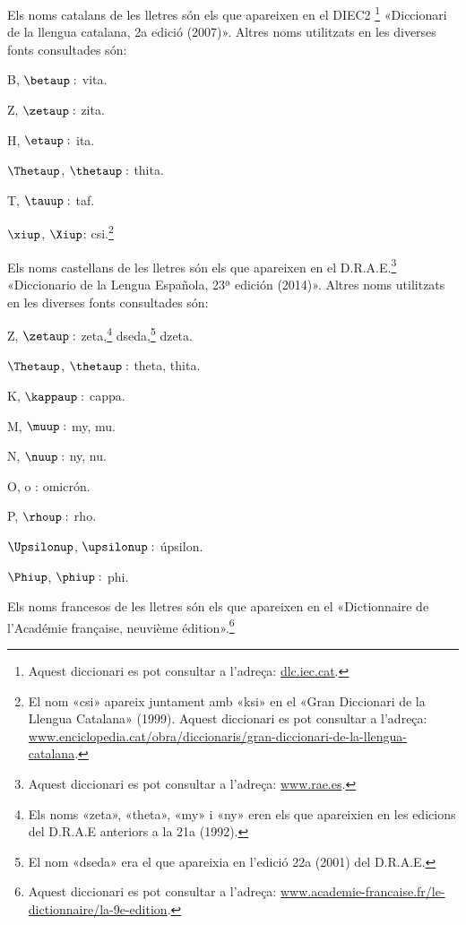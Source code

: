 Els noms catalans de les lletres són els que apareixen en el DIEC2 \footnote{Aquest diccionari es pot consultar a l'adreça: \href{http://dlc.iec.cat/}{dlc.iec.cat}.} «Diccionari de la llengua catalana, 2a edició (2007)». Altres noms utilitzats en
les diverses fonts consultades són:
\begin{multicols}{3}
\begin{list}{}
   {\setlength{\labelwidth}{16mm} \setlength{\leftmargin}{16mm} \setlength{\labelsep}{2mm}}
   \item[B, $\betaup :$] vita.
   \item[Z, $\zetaup :$] zita.
   \item[H, $\etaup :$] ita.
   \item[$\Thetaup$, $\thetaup :$] thita.
   \item[T, $\tauup :$] taf.
   \item[$\xiup$, $\Xiup$:] csi.\footnote{El nom «csi» apareix juntament amb «ksi» en el «Gran Diccionari de la Llengua Catalana» (1999). Aquest diccionari es pot consultar a l'adreça:  \href{http://www.enciclopedia.cat/obra/diccionaris/gran-diccionari-de-la-llengua-catalana}{www.enciclopedia.cat/obra/diccionaris/gran-diccionari-de-la-llengua-catalana}.}
\end{list}
\end{multicols}

Els noms castellans de les lletres són els que apareixen en el D.R.A.E.\footnote{Aquest diccionari es pot consultar a l'adreça:  \href{http://www.rae.es/}{www.rae.es}.}
«Diccionario de la Lengua Española, 23ª
edición (2014)». Altres noms utilitzats en les diverses fonts
consultades són:
\begin{multicols}{3}
\begin{list}{}
   {\setlength{\labelwidth}{16mm} \setlength{\leftmargin}{16mm} \setlength{\labelsep}{2mm}}
   \item[Z, $\zetaup :$] zeta,\footnote{\label{fn:zeta}Els noms «zeta», «theta», «my» i «ny» eren els que apareixien en les edicions
   del D.R.A.E anteriors a la 21a (1992).} dseda,\footnote{El nom «dseda» era el que apareixia en l'edició 22a (2001) del D.R.A.E.} dzeta.
   \item[$\Thetaup$, $\thetaup :$] theta, thita.
   \item[K, $\kappaup :$] cappa.
   \item[M, $\muup :$] my, mu.
   \item[N, $\nuup :$] ny, nu.
   \item[O, o :] omicrón.
   \item[P, $\rhoup :$] rho.
   \item[$\Upsilonup$, $\upsilonup :$] úpsilon.
   \item[$\Phiup$, $\phiup :$] phi.
\end{list}
\end{multicols}

Els noms francesos de les lletres són els que apareixen en el «Dictionnaire de l'Académie française, neuvième édition».\footnote{Aquest diccionari es pot consultar a l'adreça: \href{http://www.academie-francaise.fr/le-dictionnaire/la-9e-edition}{www.academie-francaise.fr/le-dictionnaire/la-9e-edition}.} 